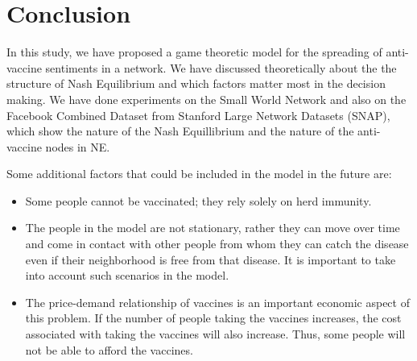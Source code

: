 \section{Conclusion}

In this study, we have proposed a game theoretic model for the spreading of anti-vaccine sentiments in a network. We have discussed theoretically about the the structure of Nash Equilibrium and which factors matter most in the decision making. We have done experiments on the Small World Network and also on the Facebook Combined Dataset from Stanford Large Network Datasets (SNAP), which show the nature of the Nash Equillibrium and the nature of the anti-vaccine nodes in NE.


Some additional factors that could be included in the model in the future are:

\begin{itemize}
    \item  Some people cannot be vaccinated; they rely solely on herd immunity.
    
    \item The people in the model are not stationary, rather they can move over time and come in contact with other people from whom they can catch the disease even if their neighborhood is free from that disease. It is important to take into account such scenarios in the model.
    
    \item The price-demand relationship of vaccines is an important economic aspect of this problem. If the number of people taking the vaccines increases, the cost associated with taking the vaccines will also increase. Thus, some people will not be able to afford the vaccines.
    
\end{itemize}
\endinput